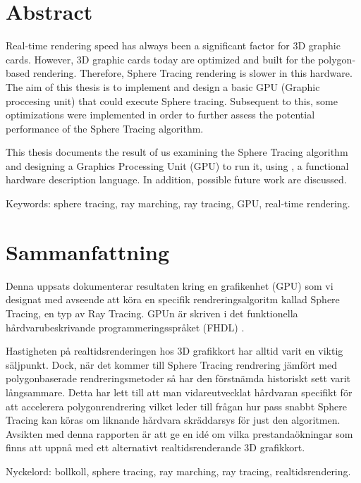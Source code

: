\thispagestyle{plain}			%
\setlength{\parskip}{0pt plus 1.0pt}

\section*{Abstract}
	
	Real-time rendering speed has always been a significant factor for 3D
	graphic cards. However, 3D graphic cards today are optimized and built for
	the polygon-based rendering. Therefore, Sphere Tracing rendering is slower
	in this hardware.  The aim of this thesis is to implement and design a
	basic GPU (Graphic proccesing unit) that could execute Sphere tracing.
	Subsequent to this, some optimizations were implemented in order to further
	assess the potential performance of the Sphere Tracing algorithm.
	
	This thesis documents the result of us examining the Sphere Tracing
	algorithm and designing a Graphics Processing Unit (GPU) to run it, using
	\clash, a functional hardware description language. In addition, possible
	future work are discussed.

	\vfill
	Keywords: sphere tracing, ray marching, ray tracing, GPU, real-time rendering.

\newpage
\thispagestyle{plain}

\section*{Sammanfattning}
	
	Denna uppsats dokumenterar resultaten kring en grafikenhet (GPU) som vi
	designat med avseende att köra en specifik rendreringsalgoritm kallad Sphere
	Tracing, en typ av Ray Tracing. GPUn är skriven i det funktionella
	hårdvarubeskrivande programmeringsspråket (FHDL) \clash.
	
	Hastigheten på realtidsrenderingen hos 3D grafikkort har alltid varit en
	viktig säljpunkt. Dock, när det kommer till Sphere Tracing rendrering jämfört
	med polygonbaserade rendreringsmetoder så har den förstnämda historiskt sett
	varit långsammare. Detta har lett till att man vidareutvecklat hårdvaran
	specifikt för att accelerera polygonrendrering vilket leder till frågan hur
	pass snabbt Sphere Tracing kan köras om liknande hårdvara skräddarsys för
	just den algoritmen. Avsikten med denna rapporten är att ge en idé om vilka
	prestandaökningar som finns att uppnå med ett alternativt realtidsrenderande
	3D grafikkort.
	
	\vfill
	Nyckelord: bollkoll, sphere tracing, ray marching, ray tracing, realtidsrendering.


\newpage
\thispagestyle{empty}
\mbox{}
